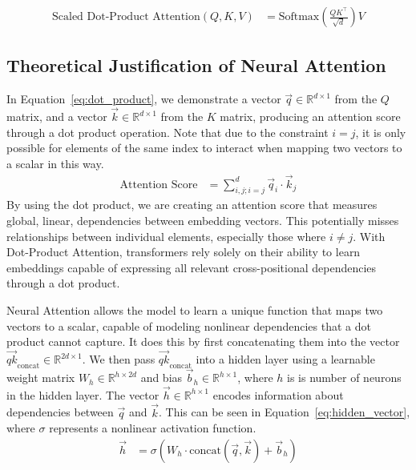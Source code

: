 \documentclass{article}
\begin{document}
\begin{align}
    \text{Scaled Dot-Product Attention}(Q, K, V) &= \text{Softmax} \left( \frac{Q K^\top}{\sqrt{d}} \right) V \label{eq:scaled_dot_product_attention}
\end{align}

\subsection{Theoretical Justification of Neural Attention}
\label{subsec:theoretical_justification}
In Equation~\ref{eq:dot_product}, we demonstrate a vector $\vec{q} \in \mathbb{R}^{d \times 1}$ from the \textbf{\textit{$Q$}} matrix, and a vector $\vec{k} \in \mathbb{R}^{d \times 1}$ from the \textbf{\textit{$K$}} matrix, producing an attention score through a dot product operation. Note that due to the constraint $i=j$, it is only possible for elements of the same index to interact when mapping two vectors to a scalar in this way. 
\begin{align}
    \text{Attention Score} &= \sum_{i,j; i=j}^{d} \vec{q}_i \cdot \vec{k}_j \label{eq:dot_product}
\end{align}
By using the dot product, we are creating an attention score that measures global, linear, dependencies between embedding vectors. This potentially misses relationships between individual elements, especially those where $i \neq j$. With Dot-Product Attention, transformers rely solely on their ability to learn embeddings capable of expressing all relevant cross-positional dependencies through a dot product. 

Neural Attention allows the model to learn a unique function that maps two vectors to a scalar, capable of modeling nonlinear dependencies that a dot product cannot capture. It does this by first concatenating them into the vector $\vec{qk}_{\text{concat}} \in \mathbb{R}^{2d \times 1}$. We then pass $\vec{qk}_{\text{concat}}$ into a hidden layer using a learnable weight matrix $\mathit{W_h} \in \mathbb{R}^{h \times 2d}$ and bias $\vec{b}_h \in \mathbb{R}^{h \times 1}$, where $h$ is is number of neurons in the hidden layer. The vector $\vec{h} \in \mathbb{R}^{h \times 1}$  encodes information about dependencies between $\vec{q}$ and $\vec{k}$. This can be seen in Equation~\ref{eq:hidden_vector}, where $\sigma$ represents a nonlinear activation function.
\begin{align}
    \vec{h} &= \sigma\left(\mathit{W_h} \cdot \text{concat}(\vec{q}, \vec{k}) + \vec{b}_h\right) \label{eq:hidden_vector}
\end{align}
\end{document}
